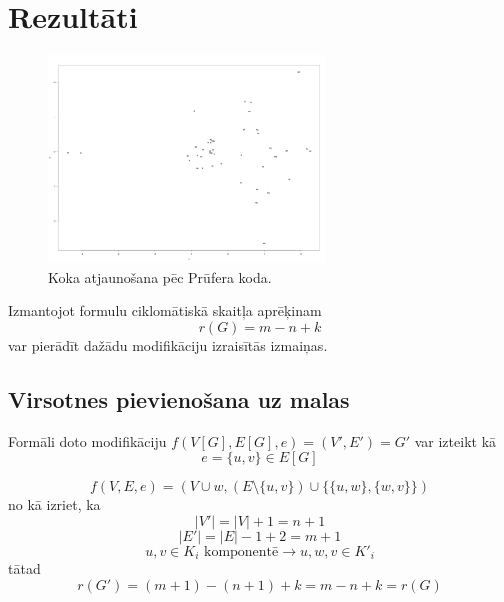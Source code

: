 \documentclass[12pt, a4paper]{article}
\begin{document}
\newpage
\section{Rezultāti}


\begin{figure}[h!]
    \centering
    \includegraphics[height=5.5cm,page=1]{distmap.png}
    \caption{Koka atjaunošana pēc Prūfera koda.}
\end{figure}


Izmantojot formulu ciklomātiskā skaitļa aprēķinam
\begin{equation}
    r(G) = m-n+k
\end{equation}
var pierādīt dažādu modifikāciju izraisītās izmaiņas.

\subsection{Virsotnes pievienošana uz malas}
Formāli doto modifikāciju $f(V[G], E[G], e)=(V',E')=G'$ var izteikt kā
\begin{equation}
    e= \lbrace u,v \rbrace \in E[G]
\end{equation}

\begin{equation}
    f(V,E,e) = (V \cup w, (E \setminus \lbrace u,v \rbrace) \cup \lbrace
    \lbrace u,w \rbrace, \lbrace w,v \rbrace 
    \rbrace)
\end{equation}
no kā izriet, ka
\begin{equation}
    \vert V' \vert = \vert V \vert + 1 = n + 1
\end{equation}
\begin{equation}
    \vert E' \vert = \vert E \vert -1 + 2 = m + 1
\end{equation}
\begin{equation}
    u,v \in K_i \text{ komponentē} \rightarrow u,w,v \in K'_i
\end{equation}
tātad
\begin{equation}
    r(G') = (m+1)-(n+1)+k = m-n+k = r(G)
\end{equation}
\end{document}
